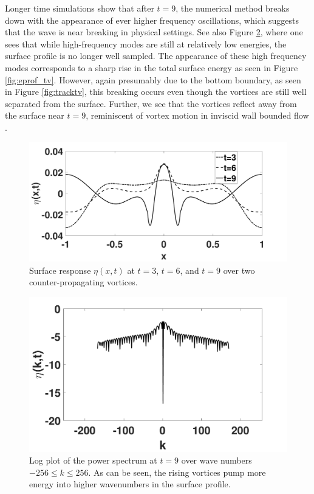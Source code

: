 \documentclass[a4paper,11pt]{article}
\begin{document}
Longer time simulations show that after $t=9$, the numerical method breaks down with the appearance of ever higher frequency oscillations, which suggests that the wave is near breaking in physical settings.  See also Figure \ref{fig:pspecFpt2}, where one sees that while high-frequency modes are still at relatively low energies, the surface profile is no longer well sampled.  The appearance of these high frequency modes corresponds to a sharp rise in the total surface energy as seen in Figure \ref{fig:eprof_tv}.  However, again presumably due to the bottom boundary, as seen in Figure \ref{fig:tracktv}, this breaking occurs even though the vortices are still well separated from the surface.  Further, we see that the vortices reflect away from the surface near $t=9$, reminiscent of vortex motion in inviscid wall bounded flow \cite{lamb}. 
\begin{figure}[!h]
\centering
\includegraphics[width=.75\textwidth]{surf_resp_mu_pt2_F_pt2}
\caption{Surface response $\eta(x,t)$ at $t=3$, $t=6$, and $t=9$ over two counter-propagating vortices.}
\label{fig:surfrepFpt2}
\end{figure}
\begin{figure}[!h]
\centering
\includegraphics[width=.75\textwidth]{pspec_mu_pt2_F_pt2_tf_9}
\caption{Log plot of the power spectrum at $t = 9$ over wave numbers $-256\leq k \leq 256$.  As can be seen, the rising vortices pump more energy into higher wavenumbers in the surface profile.}
\label{fig:pspecFpt2}
\end{figure}
\end{document}
